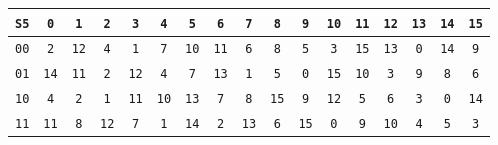 \documentclass{article}
\begin{document}
\begin{center}
\vspace{10pt}
\begin{tabular}{|c|cccccccccccccccc|}
  \hline
\texttt{S5} & \texttt{0} & \texttt{1} & \texttt{2} & \texttt{3} & \texttt{4} & \texttt{5} & \texttt{6} & \texttt{7} & \texttt{8} & \texttt{9} & \texttt{10} & \texttt{11} & \texttt{12} & \texttt{13} & \texttt{14} & \texttt{15} \\
\hline
\texttt{0}\texttt{0} & \texttt{2} & \texttt{1}\texttt{2} & \texttt{4} & \texttt{1} & \texttt{7} & \texttt{1}\texttt{0} & \texttt{1}\texttt{1} & \texttt{6} & \texttt{8} & \texttt{5} & \texttt{3} & \texttt{1}\texttt{5} & \texttt{1}\texttt{3} & \texttt{0} & \texttt{1}\texttt{4} & \texttt{9} \\
\texttt{0}\texttt{1} & \texttt{1}\texttt{4} & \texttt{1}\texttt{1} & \texttt{2} & \texttt{1}\texttt{2} & \texttt{4} & \texttt{7} & \texttt{1}\texttt{3} & \texttt{1} & \texttt{5} & \texttt{0} & \texttt{1}\texttt{5} & \texttt{1}\texttt{0} & \texttt{3} & \texttt{9} & \texttt{8} & \texttt{6} \\
\texttt{1}\texttt{0} & \texttt{4} & \texttt{2} & \texttt{1} & \texttt{1}\texttt{1} & \texttt{1}\texttt{0} & \texttt{1}\texttt{3} & \texttt{7} & \texttt{8} & \texttt{1}\texttt{5} & \texttt{9} & \texttt{1}\texttt{2} & \texttt{5} & \texttt{6} & \texttt{3} & \texttt{0} & \texttt{1}\texttt{4} \\
\texttt{1}\texttt{1} & \texttt{1}\texttt{1} & \texttt{8} & \texttt{1}\texttt{2} & \texttt{7} & \texttt{1} & \texttt{1}\texttt{4} & \texttt{2} & \texttt{1}\texttt{3} & \texttt{6} & \texttt{1}\texttt{5} & \texttt{0} & \texttt{9} & \texttt{1}\texttt{0} & \texttt{4} & \texttt{5} & \texttt{3} \\
\hline
\end{tabular}


\end{center}
\end{document}
